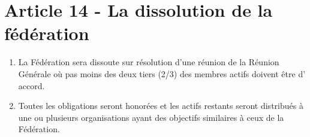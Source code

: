 \section{Article 14 - La dissolution de la fédération}
\label{article-14-la-dissolution-de-la-federation}

\begin{enumerate}
 \item
  La Fédération sera dissoute sur résolution d'une réunion de la Réunion Générale où pas moins des deux tiers (2/3) des membres actifs doivent être d' accord.
 \item
  Toutes les obligations seront honorées et les actifs restants seront distribués à une ou plusieurs organisations ayant des objectifs similaires à ceux de la Fédération.
\end{enumerate}
